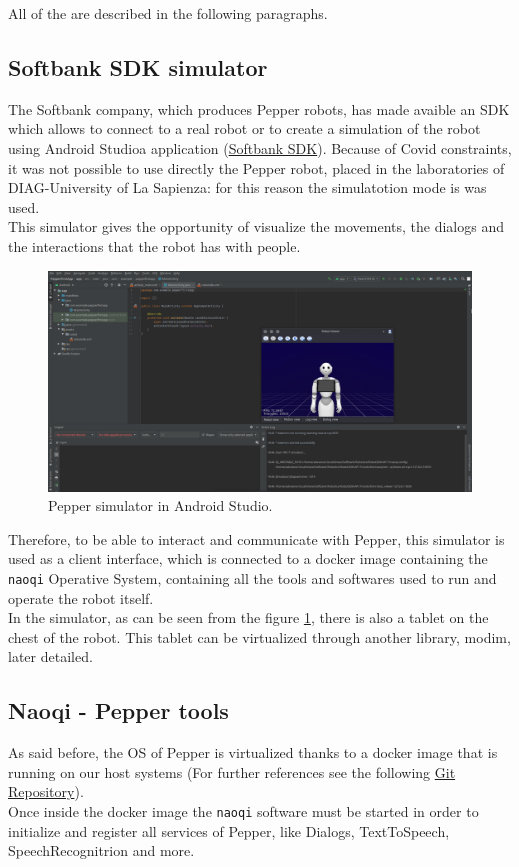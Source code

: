 \documentclass[12pt, letterpaper, twoside]{article}
\begin{document}
All of the are described in the following paragraphs.\\

\subsection{Softbank SDK simulator}
The Softbank company, which produces Pepper robots, has made avaible an SDK which allows to connect to a real robot or to create a simulation of the robot using Android Studioa application (\href{https://qisdk.softbankrobotics.com/sdk/doc/pepper-sdk/index.html}{Softbank SDK}). Because of Covid constraints, it was not possible to use directly the Pepper robot, placed in the laboratories of DIAG-University of La Sapienza: for this reason the simulatotion mode is was used.\\

This simulator gives the opportunity of visualize the movements, the dialogs and the interactions that the robot has with people.

\begin{figure}[htbp]
	\centerline{\includegraphics[scale=.3]{img/pepperSDK.png}}
	\caption{Pepper simulator in Android Studio.}
	\label{fig:android_sdk}
\end{figure}

Therefore, to be able to interact and communicate with Pepper, this simulator is used as a client interface, which is connected to a docker image containing the \verb|naoqi| Operative System, containing all the tools and softwares used to run and operate the robot itself.\\
In the simulator, as can be seen from the figure \ref{fig:android_sdk}, there is also a tablet on the chest of the robot. This tablet can be virtualized through another library, modim, later detailed.

\subsection{Naoqi - Pepper tools}
As said before, the OS of Pepper is virtualized thanks to a docker image that is running on our host systems (For further references see the following \href{https://bitbucket.org/iocchi/hri_software/src/master/}{Git Repository}).\\
Once inside the docker image the \verb|naoqi| software must be started in order to initialize and register all services of Pepper, like Dialogs, TextToSpeech, SpeechRecognitrion and more.\\
\end{document}
